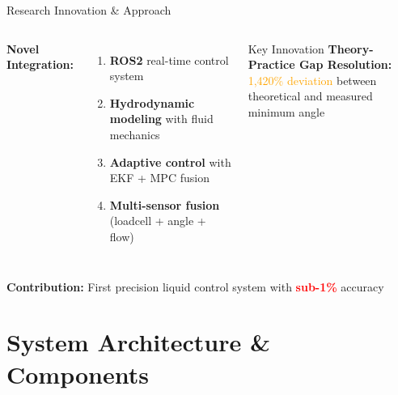 \documentclass[aspectratio=169]{beamer}
\begin{document}
\begin{frame}{Research Innovation \& Approach}
\begin{columns}[T]
\textbf{Novel Integration:}
\begin{enumerate}
    \item \textbf{ROS2} real-time control system
    \item \textbf{Hydrodynamic modeling} with fluid mechanics
    \item \textbf{Adaptive control} with EKF + MPC fusion
    \item \textbf{Multi-sensor fusion} (loadcell + angle + flow)
\end{enumerate}

\begin{exampleblock}{Key Innovation}
\textbf{Theory-Practice Gap Resolution:}\\
\textcolor{orange}{1,420\% deviation} between theoretical and measured minimum angle
\end{exampleblock}
\end{columns}

\vspace{1em}
\begin{center}
\textbf{Contribution:} First precision liquid control system with \textcolor{red}{\textbf{sub-1\%}} accuracy
\end{center}
\end{frame}

\section{System Architecture \& Components}
\end{document}
